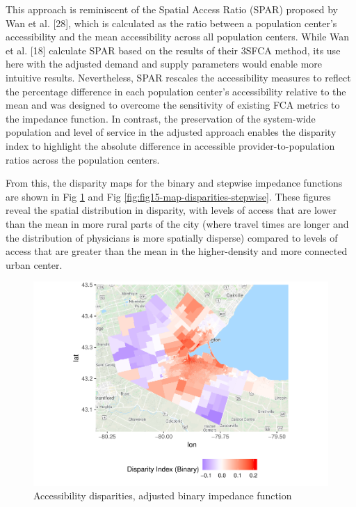 \documentclass[10pt,letterpaper]{article}
\begin{document}
This approach is reminiscent of the Spatial Access Ratio (SPAR) proposed
by Wan et al. {[}28{]}, which is calculated as the ratio between a
population center's accessibility and the mean accessibility across all
population centers. While Wan et al. {[}18{]} calculate SPAR based on
the results of their 3SFCA method, its use here with the adjusted demand
and supply parameters would enable more intuitive results. Nevertheless,
SPAR rescales the accessibility measures to reflect the percentage
difference in each population center's accessibility relative to the
mean and was designed to overcome the sensitivity of existing FCA
metrics to the impedance function. In contrast, the preservation of the
system-wide population and level of service in the adjusted approach
enables the disparity index to highlight the absolute difference in
accessible provider-to-population ratios across the population centers.

From this, the disparity maps for the binary and stepwise impedance
functions are shown in Fig \ref{fig:fig14-map-disparities-binary} and
Fig \ref{fig:fig15-map-disparities-stepwise}. These figures reveal the
spatial distribution in disparity, with levels of access that are lower
than the mean in more rural parts of the city (where travel times are
longer and the distribution of physicians is more spatially disperse)
compared to levels of access that are greater than the mean in the
higher-density and more connected urban center.

\begin{figure}
\centering
\includegraphics{Supply_and_Demand_Inflation_in_FCA_Methods_v2.0_files/figure-latex/fig14-map-disparities-binary-1.pdf}
\caption{\label{fig:fig14-map-disparities-binary}Accessibility
disparities, adjusted binary impedance function}
\end{figure}
\end{document}
